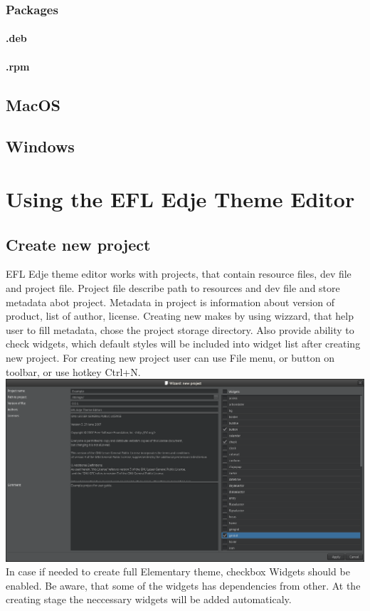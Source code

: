 \documentclass[titlepage,oneside,11pt]{book}
\begin{document}
\subsection{Packages}
\subsubsection{.deb}
\subsubsection{.rpm}
\newpage
\section{MacOS}
\newpage
\section{Windows}
\chapter{Using the EFL Edje Theme Editor}
\section{Create new project}
EFL Edje theme editor works with projects, that contain resource files, dev file and project file.
Project file describe path to resources and dev file and store metadata abot project. Metadata in project is information about version of product, list of author, license. \newline
Creating new  makes by using wizzard, that help user to fill metadata, chose the project storage directory. Also provide ability to check widgets, which default styles will be included into widget list after creating new project.\newline
For creating new project user can use File menu, or button on toolbar, or use hotkey Ctrl+N.\newline
\includegraphics[scale=0.3]{images/wizzard_new_project.png}\newline
In case if needed to create full Elementary theme, checkbox Widgets should be enabled. Be aware, that some of the widgets has dependencies from other. At the creating stage the neccessary widgets will be added automaticaly.
\end{document}
